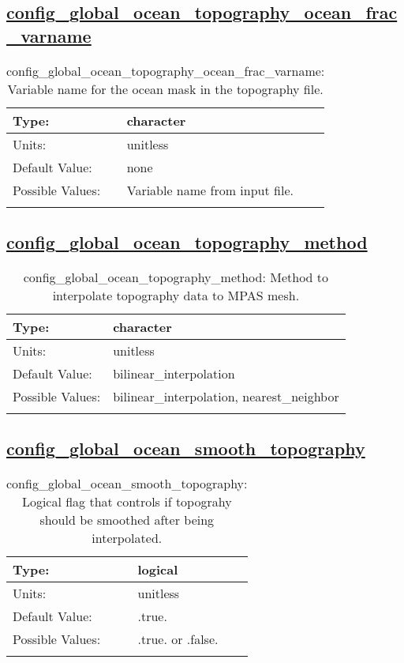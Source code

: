 \subsection[config\_global\_ocean\_topography\_ocean\_frac\_varname]{\hyperref[sec:nm_tab_global_ocean]{config\_global\_ocean\_topography\_ocean\_frac\_varname}}
\label{subsec:nm_sec_config_global_ocean_topography_ocean_frac_varname}
\begin{center}
\begin{longtable}{| p{2.0in} || p{4.0in} |}
    \hline
    Type: & character \\
    \hline
    Units: & \si{unitless} \\
    \hline
    Default Value: & none \\
    \hline
    Possible Values: & Variable name from input file. \\
    \hline
    \caption{config\_global\_ocean\_topography\_ocean\_frac\_varname: Variable name for the ocean mask in the topography file.}
\end{longtable}
\end{center}
\subsection[config\_global\_ocean\_topography\_method]{\hyperref[sec:nm_tab_global_ocean]{config\_global\_ocean\_topography\_method}}
\label{subsec:nm_sec_config_global_ocean_topography_method}
\begin{center}
\begin{longtable}{| p{2.0in} || p{4.0in} |}
    \hline
    Type: & character \\
    \hline
    Units: & \si{unitless} \\
    \hline
    Default Value: & bilinear\_interpolation \\
    \hline
    Possible Values: & bilinear\_interpolation, nearest\_neighbor \\
    \hline
    \caption{config\_global\_ocean\_topography\_method: Method to interpolate topography data to MPAS mesh.}
\end{longtable}
\end{center}
\subsection[config\_global\_ocean\_smooth\_topography]{\hyperref[sec:nm_tab_global_ocean]{config\_global\_ocean\_smooth\_topography}}
\label{subsec:nm_sec_config_global_ocean_smooth_topography}
\begin{center}
\begin{longtable}{| p{2.0in} || p{4.0in} |}
    \hline
    Type: & logical \\
    \hline
    Units: & \si{unitless} \\
    \hline
    Default Value: & .true. \\
    \hline
    Possible Values: & .true. or .false. \\
    \hline
    \caption{config\_global\_ocean\_smooth\_topography: Logical flag that controls if topograhy should be smoothed after being interpolated.}
\end{longtable}
\end{center}
